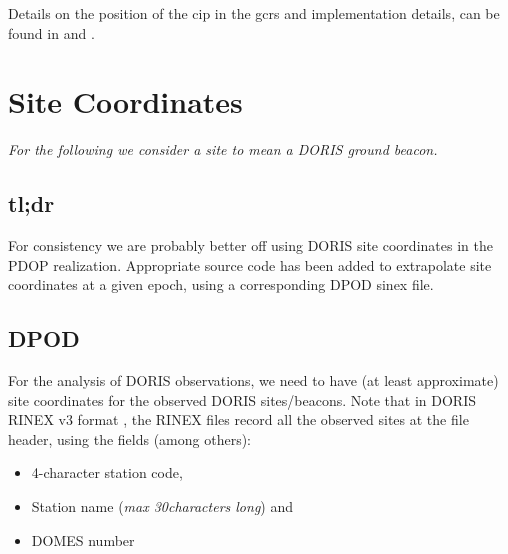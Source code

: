 Details on the position of the \gls{cip} in the \gls{gcrs} and implementation 
details, can be found in \cite{CapitaineAndWallace2006} and 
\cite{Capitaineetal2003a}.

\fi

\section{Site Coordinates}
\label{sec:site-coordinates}

\emph{For the following we consider a site to mean a DORIS ground beacon.}

\subsection{tl;dr}
For consistency we are probably better off using DORIS site coordinates in the 
PDOP realization. Appropriate source code has been added to extrapolate site 
coordinates at a given epoch, using a corresponding DPOD \gls{sinex} file.


\subsection{DPOD}
\label{sec:pdop}
For the analysis of DORIS observations, we need to have (at least approximate) 
site coordinates for the observed DORIS sites/beacons. Note that in DORIS RINEX 
v3 format \cite{DORISRNX3}, the RINEX files record all the observed sites at the 
file header, using the fields (among others):
\begin{itemize}
    \item 4-character station code,
    \item Station name (\textit{max 30characters long}) and 
    \item DOMES number
\end{itemize}

